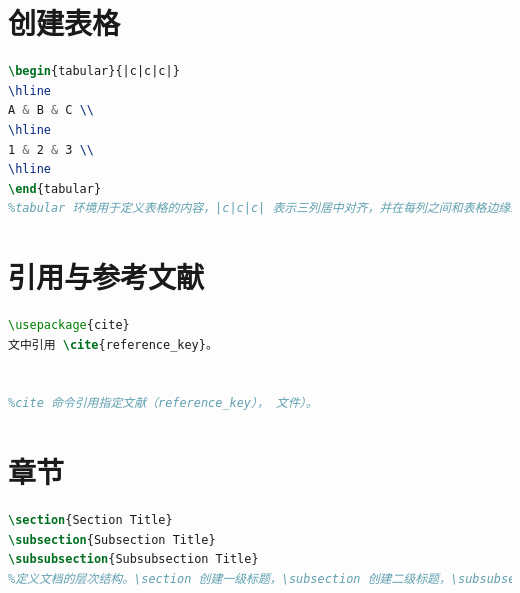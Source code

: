 \documentclass[a4paper, 12pt]{article}
\begin{document}
\section{创建表格}
\begin{lstlisting}[language=TeX]
\begin{tabular}{|c|c|c|}
\hline
A & B & C \\
\hline
1 & 2 & 3 \\
\hline
\end{tabular}
%tabular 环境用于定义表格的内容，|c|c|c| 表示三列居中对齐，并在每列之间和表格边缘绘制竖线，\hline 绘制水平线，& 分隔列内容，\\ 表示换行。
\end{lstlisting}

\section{引用与参考文献}
\begin{lstlisting}[language=TeX]
\usepackage{cite}  
文中引用 \cite{reference_key}。


%cite 命令引用指定文献（reference_key）， 文件）。
\end{lstlisting}

\section{章节}
\begin{lstlisting}[language=TeX]
\section{Section Title}
\subsection{Subsection Title}
\subsubsection{Subsubsection Title}
%定义文档的层次结构。\section 创建一级标题，\subsection 创建二级标题，\subsubsection 创建三级标题。LaTeX 自动为这些标题编号，并包含在目录中。
\end{lstlisting}
\end{document}

